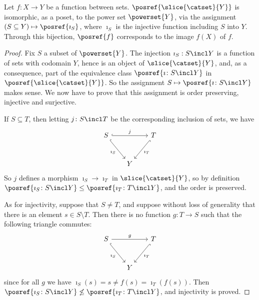    \begingroup
    \def\theproposition{\ref{prop: dhom0 for set/y}}
    \begin{proposition}
        Let $f\colon X \to Y$ be a function between sets. $\posref{\slice{\catset}{Y}}$ is isomorphic, as a poset, to the power set $\powerset{Y}$, via the assignment $(S \subseteq Y) \mapsto \posref{\imath_S}$, where $\imath_S$ is the injective function including $S$ into $Y$. Through this bijection, $\posref{f}$ corresponds to the image $f(X)$ of $f$.
    \end{proposition}
    \addtocounter{proposition}{-1}
    \endgroup
    \begin{proof}
        Fix $S$ a subset of $\powerset{Y}$. The injection $\imath_S: S \incl Y$ is a function of sets with codomain $Y$, hence is an object of $\slice{\catset}{Y}$, and, as a consequence, part of the equivalence class $\posref{\imath\colon S \incl Y}$ in $\posref{\slice{\catset}{Y}}$.
        So the assignment $S \mapsto \posref{\imath\colon S \incl Y}$ makes sense. We now have to prove that this assignment is order preserving, injective and surjective.
        
        If $S \subseteq T$, then letting $j\colon S \incl T$ be the corresponding inclusion of sets, we have
        \[\begin{tikzcd}[sep=scriptsize]
	S && T \\
	\\
	& Y
	\arrow["{\imath_S}"', hook, from=1-1, to=3-2]
	\arrow["{\imath_T}", hook, from=1-3, to=3-2]
	\arrow["j", hook, from=1-1, to=1-3]
        \end{tikzcd}\]
        So $j$ defines a morphism $\imath_S \to \imath_T$ in $\slice{\catset}{Y}$, so by definition
        $\posref{\imath_S\colon S \incl Y} \leq \posref{\imath_T\colon T \incl Y}$, and the order is preserved.

        As for injectivity, suppose that $S \neq T$, and suppose without loss of generality that there is an element $s \in S \setminus T$. Then there is no function $g\colon T \to S$ such that the following triangle commutes:
        \[\begin{tikzcd}[sep=scriptsize]
	S && T \\
	\\
	& Y
	\arrow["{\imath_S}"', hook, from=1-1, to=3-2]
	\arrow["{\imath_T}", hook, from=1-3, to=3-2]
	\arrow["g", from=1-1, to=1-3]
        \end{tikzcd}\]
        since for all $g$ we have $\imath_S(s) = s \neq f(s) = \imath_T(f(s))$. Then $\posref{\imath_S\colon S \incl Y} \not\leq \posref{\imath_T\colon T \incl Y}$, and injectivity is proved.


\end{proof}
